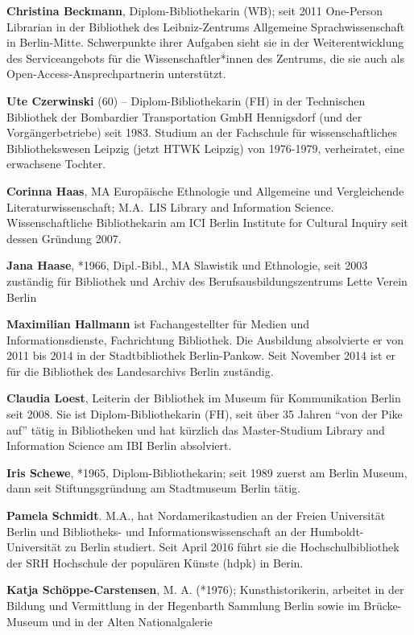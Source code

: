 \documentclass[a4paper,
fontsize=11pt,
oneside,
numbers=noperiodatend,
parskip=half-,
bibliography=totoc,
final
]{scrartcl}
\begin{document}
\textbf{Christina Beckmann}, Diplom-Bibliothekarin (WB); seit 2011
One-Person Librarian in der Bibliothek des Leibniz-Zentrums Allgemeine
Sprachwissenschaft in Berlin-Mitte. Schwerpunkte ihrer Aufgaben sieht
sie in der Weiterentwicklung des Serviceangebots für die
Wissenschaftler*innen des Zentrums, die sie auch als
Open-Access-Ansprechpartnerin unterstützt.

\textbf{Ute Czerwinski} (60) -- Diplom-Bibliothekarin (FH) in der
Technischen Bibliothek der Bombardier Transportation GmbH Hennigsdorf
(und der Vorgängerbetriebe) seit 1983. Studium an der Fachschule für
wissenschaftliches Bibliothekswesen Leipzig (jetzt HTWK Leipzig) von
1976-1979, verheiratet, eine erwachsene Tochter.

\textbf{Corinna Haas}, MA Europäische Ethnologie und Allgemeine und
Vergleichende Literaturwissenschaft; M.A.~LIS Library and Information
Science. Wissenschaftliche Bibliothekarin am ICI Berlin Institute for
Cultural Inquiry seit dessen Gründung 2007.

\textbf{Jana Haase}, *1966, Dipl.-Bibl., MA Slawistik und Ethnologie,
seit 2003 zuständig für Bibliothek und Archiv des
Berufsausbildungszentrums Lette Verein Berlin

\textbf{Maximilian Hallmann} ist Fachangestellter für Medien und
Informationsdienste, Fachrichtung Bibliothek. Die Ausbildung absolvierte
er von 2011 bis 2014 in der Stadtbibliothek Berlin-Pankow. Seit November
2014 ist er für die Bibliothek des Landesarchivs Berlin zuständig.

\textbf{Claudia Loest}, Leiterin der Bibliothek im Museum für
Kommunikation Berlin seit 2008. Sie ist Diplom-Bibliothekarin (FH), seit
über 35 Jahren ``von der Pike auf'' tätig in Bibliotheken und hat
kürzlich das Master-Studium Library and Information Science am IBI
Berlin absolviert.

\textbf{Iris Schewe}, *1965, Diplom-Bibliothekarin; seit 1989 zuerst am
Berlin Museum, dann seit Stiftungsgründung am Stadtmuseum Berlin tätig.

\textbf{Pamela Schmidt}. M.A., hat Nordamerikastudien an der Freien
Universität Berlin und Bibliotheks- und Informationswissenschaft an der
Humboldt-Universität zu Berlin studiert. Seit April 2016 führt sie die
Hochschulbibliothek der SRH Hochschule der populären Künste (hdpk) in
Berin.

\textbf{Katja Schöppe-Carstensen}, M. A. (*1976); Kunsthistorikerin,
arbeitet in der Bildung und Vermittlung in der Hegenbarth Sammlung
Berlin sowie im Brücke-Museum und in der Alten Nationalgalerie
\end{document}
